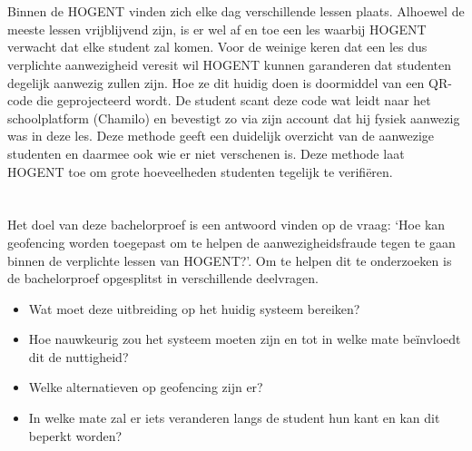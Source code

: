 \section{}%
\label{sec:probleemstelling}

Binnen de HOGENT vinden zich elke dag verschillende lessen plaats. Alhoewel de meeste lessen vrijblijvend zijn, is er wel af en toe een les waarbij HOGENT verwacht dat elke student zal komen. Voor de weinige keren dat een les dus verplichte aanwezigheid veresit wil HOGENT kunnen garanderen dat studenten degelijk aanwezig zullen zijn. Hoe ze dit huidig doen is doormiddel van een QR-code die geprojecteerd wordt. De student scant deze code wat leidt naar het schoolplatform (Chamilo) en bevestigt zo via zijn account dat hij fysiek aanwezig was in deze les. Deze methode geeft een duidelijk overzicht van de aanwezige studenten en daarmee ook wie er niet verschenen is. Deze methode laat HOGENT toe om grote hoeveelheden studenten tegelijk te verifiëren. 

\section{}%
\label{sec:onderzoeksvraag}

Het doel van deze bachelorproef is een antwoord vinden op de vraag: `Hoe kan geofencing worden toegepast om te helpen de aanwezigheidsfraude tegen te gaan binnen de verplichte lessen van HOGENT?'. Om te helpen dit te onderzoeken is de bachelorproef opgesplitst in verschillende deelvragen.  
\begin{itemize} %
  \item Wat moet deze uitbreiding op het huidig systeem bereiken?
  \item Hoe nauwkeurig zou het systeem moeten zijn en tot in welke mate beïnvloedt dit de nuttigheid?
  \item Welke alternatieven op geofencing zijn er?
  \item In welke mate zal er iets veranderen langs de student hun kant en kan dit beperkt worden?
\end{itemize} 

\section{}%
\label{sec:onderzoeksdoelstelling}

